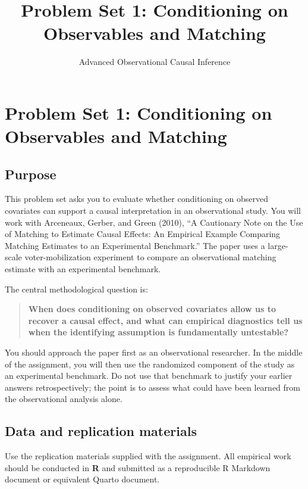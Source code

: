 \documentclass[
]{article}
\title{Problem Set 1: Conditioning on Observables and Matching}
\author{Advanced Observational Causal Inference}
\date{}
\begin{document}
\maketitle

\section{Problem Set 1: Conditioning on Observables and
Matching}\label{problem-set-1-conditioning-on-observables-and-matching}

\subsection{Purpose}\label{purpose}

This problem set asks you to evaluate whether conditioning on observed
covariates can support a causal interpretation in an observational
study. You will work with Arceneaux, Gerber, and Green (2010), ``A
Cautionary Note on the Use of Matching to Estimate Causal Effects: An
Empirical Example Comparing Matching Estimates to an Experimental
Benchmark.'' The paper uses a large-scale voter-mobilization experiment
to compare an observational matching estimate with an experimental
benchmark.

The central methodological question is:

\begin{quote}
\textbf{When does conditioning on observed covariates allow us to
recover a causal effect, and what can empirical diagnostics tell us when
the identifying assumption is fundamentally untestable?}
\end{quote}

You should approach the paper first as an observational researcher. In
the middle of the assignment, you will then use the randomized component
of the study as an experimental benchmark. Do not use that benchmark to
justify your earlier answers retrospectively; the point is to assess
what could have been learned from the observational analysis alone.

\subsection{Data and replication
materials}\label{data-and-replication-materials}

Use the replication materials supplied with the assignment. All
empirical work should be conducted in \textbf{R} and submitted as a
reproducible R Markdown document or equivalent Quarto document.
\end{document}
